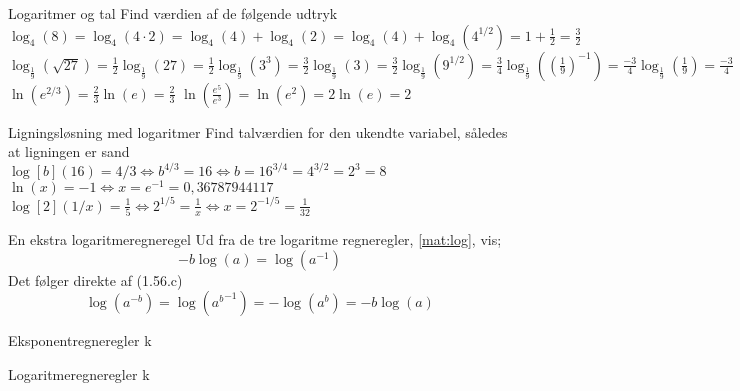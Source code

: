 \begin{opgave}[1]{Logaritmer og tal}
    Find værdien af de følgende udtryk
    \opg $\log_4(8) = \log_4(4\cdot 2)=\log_4(4)+\log_4(2)=\log_4(4)+\log_4(4^{1/2})=1+\frac{1}{2}=\frac{3}{2}$
    \opg $\log_\frac{1}{9} \left(\sqrt{27}\right)=\frac{1}{2}\log_\frac{1}{9}\left(27\right)=\frac{1}{2}\log_\frac{1}{9}\left(3^3\right)=\frac{3}{2}\log_\frac{1}{9}\left(3\right)=\frac{3}{2}\log_\frac{1}{9}\left(9^{1/2}\right)=\frac{3}{4}\log_\frac{1}{9}\left(\left(\frac{1}{9}\right)^{-1}\right)=\frac{-3}{4}\log_\frac{1}{9}\left(\frac{1}{9}\right)=\frac{-3}{4}$
    \opg $\ln(e^{2/3})=\frac{2}{3}\ln(e)=\frac{2}{3}$
    \opg $\ln(\frac{e^5}{e^3})=\ln(e^2)=2\ln(e)=2$
\end{opgave}

\begin{opgave}[2]{Ligningsløsning med logaritmer}
Find talværdien for den ukendte variabel, således at ligningen er sand
    \opg $\log[b](16) = 4/3 \iff b^{4/3}=16\iff b=16^{3/4}=4^{3/2}=2^3=8$
    \opg $\ln(x) = -1 \iff x=e^{-1}=0,36787944117$
    \opg $\log[2](1/x)=\frac{1}{5}\iff 2^{1/5}=\frac{1}{x}\iff x=2^{-1/5}=\frac{1}{32}$
\end{opgave}


\begin{opgave}[3]{En ekstra logaritmeregneregel}
    Ud fra de tre logaritme regneregler, \eqref{mat:log}, vis;
    $$
    -b\log(a)=\log(a^{-1})
    $$
    Det følger direkte af (1.56.c)
    $$
        \log(a^{-b})=\log({a^b}^{-1})=-\log(a^b)=-b\log(a)
    $$
\end{opgave}
\begin{opgave}[3]{Eksponentregneregler}
    k
\end{opgave}
\begin{opgave}[4]{Logaritmeregneregler}
    k
\end{opgave}